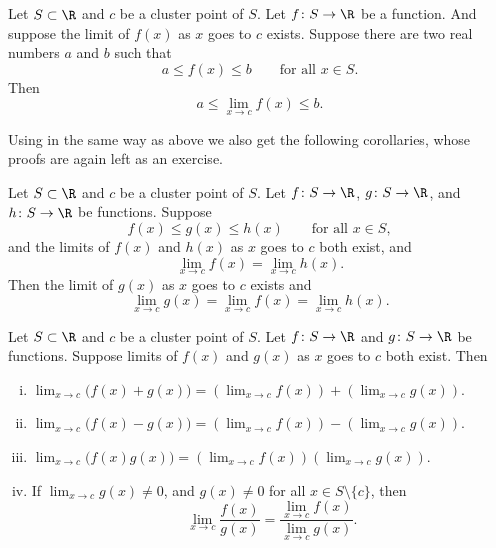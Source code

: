 \documentclass[12pt]{book}
\begin{document}
\begin{cor} \label{fconstineq:cor}
Let $S \subset \R$ and $c$ be a cluster point of $S$.
Let $f \colon S \to
\R$ be a function.
And suppose the limit of $f(x)$ as $x$ goes to $c$
exists.
Suppose there are two real numbers $a$ and $b$ such that
\begin{equation*}
a \leq f(x) \leq b \qquad \text{for all $x \in S$}.
\end{equation*}
Then
\begin{equation*}
a \leq \lim_{x\to c} f(x) \leq b .
\end{equation*}
\end{cor}

Using  in the same way as above we also get
the following corollaries, whose proofs are again left as an exercise.

\begin{cor} \label{fsqueeze:cor}
Let $S \subset \R$ and $c$ be a cluster point of $S$.
Let $f \colon S \to
\R$,
$g \colon S \to \R$, and $h \colon S \to \R$ be functions.
Suppose 
\begin{equation*}
f(x) \leq g(x) \leq h(x) \qquad \text{for all $x \in S$},
\end{equation*}
and the limits of $f(x)$ and $h(x)$ as $x$ goes to $c$ both exist, and
\begin{equation*}
\lim_{x\to c} f(x) = \lim_{x\to c} h(x) .
\end{equation*}
Then the limit of $g(x)$ as $x$ goes to $c$ exists and
\begin{equation*}
\lim_{x\to c} g(x) =
\lim_{x\to c} f(x) = \lim_{x\to c} h(x) .
\end{equation*}
\end{cor}

\begin{cor} \label{falg:cor}
Let $S \subset \R$ and $c$ be a cluster point of $S$.
Let $f \colon S \to
\R$ and
$g \colon S \to \R$ be functions. 
Suppose limits of $f(x)$ and $g(x)$ as $x$ goes to $c$ both exist.
Then
\begin{enumerate}[(i)]
\item
$\displaystyle
\lim_{x\to c} \bigl(f(x)+g(x)\bigr) = \left(\lim_{x\to c} f(x)\right) + 
\left(\lim_{x\to c} g(x)\right) .
$
\item
$\displaystyle
\lim_{x\to c} \bigl(f(x)-g(x)\bigr) = \left(\lim_{x\to c} f(x)\right) -
\left(\lim_{x\to c} g(x)\right) .
$
\item
$\displaystyle
\lim_{x\to c} \bigl(f(x)g(x)\bigr) = \left(\lim_{x\to c} f(x)\right)
\left(\lim_{x\to c} g(x)\right) .
$
\item \label{falg:cor:iv} If
$\displaystyle \lim_{x\to c} g(x) \not= 0$,
and $g(x) \not= 0$ for all $x \in S \setminus \{ c \}$, then
\begin{equation*}
\lim_{x\to c} \frac{f(x)}{g(x)} =
\frac{\lim_{x\to c} f(x)}{\lim_{x\to c} g(x)} .
\end{equation*}
\end{enumerate}
\end{cor}
\end{document}
